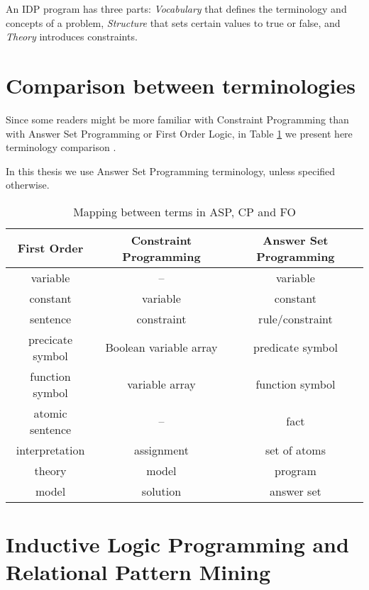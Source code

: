 An IDP program has three parts: \textit{Vocabulary} that defines the terminology and concepts of a problem, \textit{Structure} that sets certain values to true or false, and \textit{Theory} introduces constraints.




\section{Comparison between terminologies}
Since some readers might be more familiar with Constraint Programming than with Answer Set Programming or First Order Logic, in Table \ref{tab:terminology_comparison} we present here terminology comparison \cite{phd_broes}.

In this thesis we use Answer Set Programming terminology, unless specified otherwise.
\begin{table}
  \centering
  \begin{tabular}{c | c | c}
    \textbf{First Order} & \textbf{Constraint Programming} & \textbf{Answer Set Programming}\\ \hline
    variable & --         & variable\\
    constant & variable   & constant \\
    sentence & constraint & rule/constraint \\
    precicate symbol & Boolean variable array & predicate symbol\\
    function symbol &  variable array & function symbol\\
    atomic sentence & -- & fact\\
    interpretation & assignment & set of atoms\\
    theory & model & program \\
    model & solution & answer set
  \end{tabular}
  \caption{Mapping between terms in ASP, CP and FO}
  \label{tab:terminology_comparison}
\end{table}


\section{Inductive Logic Programming and Relational Pattern Mining}
